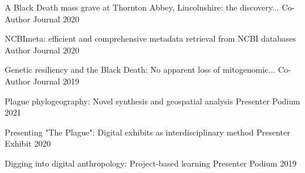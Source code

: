 



\begin{cvhonors}


    \cvhonor
        {A Black Death mass grave at Thornton Abbey, Lincolnshire: the discovery...} %
        {Co-Author} %
        {Journal} %
        {2020} %

    \cvhonor
        {NCBImeta: efficient and comprehensive metadata retrieval from NCBI databases} %
        {Author} %
        {Journal} %
        {2020} %

    \cvhonor
        {Genetic resiliency and the Black Death: No apparent loss of mitogenomic...} %
        {Co-Author} %
        {Journal} %
        {2019} %

\end{cvhonors}



\begin{cvhonors}


    \cvhonor
        {Plague phylogeography: Novel synthesis and geospatial analysis} %
        {Presenter} %
        {Podium} %
        {2021} %

    \cvhonor
        {Presenting "The Plague": Digital exhibits as interdisciplinary method} %
        {Presenter} %
        {Exhibit} %
        {2020} %

    \cvhonor
        {Digging into digital anthropology: Project-based learning} %
        {Presenter} %
        {Podium} %
        {2019} %

\end{cvhonors}



